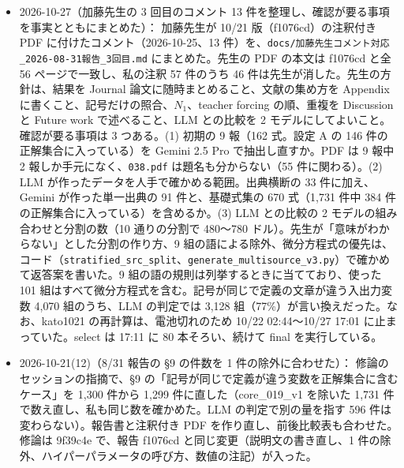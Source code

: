 \documentclass[11pt,a4paper]{jsarticle}
\begin{document}
\begin{itemize}[nosep]
    呼び出しの回数（異なるテストケースの数）は 10 分割で 1{,}673 回、3 分割で 1{,}307 回、1 回分の入力の最大は 952{,}918 トークン。費用の見積もり（出力 2{,}000 トークン/回）は 4 モデルの合計で 10 分割 1{,}261 USD、3 分割 990 USD。版 3 の記録には、使った \texttt{training\_cases.json} とテストケースの文の sha256 も残すようにした。有料の呼び出しはまだしていない（モデルは 2 つに減らしてよいと加藤先生から返事があった。分割の数とデータベースの作り直しが決まってから流す）。試験は 59 件。
  \item 2026-10-27（加藤先生の 3 回目のコメント 13 件を整理し、確認が要る事項を事実とともにまとめた）：
    加藤先生が 10/21 版（f1076cd）の注釈付き PDF に付けたコメント（2026-10-25、13 件）を、\texttt{docs/加藤先生コメント対応\_2026-08-31報告\_3回目.md} にまとめた。先生の PDF の本文は f1076cd と全 56 ページで一致し、私の注釈 57 件のうち 46 件は先生が消した。先生の方針は、結果を Journal 論文に随時まとめること、文献の集め方を Appendix に書くこと、記号だけの照合、$N_1$、teacher forcing の順、重複を Discussion と Future work で述べること、LLM との比較を 2 モデルにしてよいこと。確認が要る事項は 3 つある。(1) 初期の 9 報（162 式。設定 A の 146 件の正解集合に入っている）を Gemini 2.5 Pro で抽出し直すか。PDF は 9 報中 2 報しか手元になく、\texttt{038.pdf} は題名も分からない（55 件に関わる）。(2) LLM が作ったデータを人手で確かめる範囲。出典横断の 33 件に加え、Gemini が作った単一出典の 91 件と、基礎式集の 670 式（1{,}731 件中 384 件の正解集合に入っている）を含めるか。(3) LLM との比較の 2 モデルの組み合わせと分割の数（10 通りの分割で 480〜780 ドル）。先生が「意味がわからない」とした分割の作り方、9 組の語による除外、微分方程式の優先は、コード（\texttt{stratified\_src\_split}、\texttt{generate\_multisource\_v3.py}）で確かめて返答案を書いた。9 組の語の規則は列挙するときに当てており、使った 101 組はすべて微分方程式を含む。記号が同じで定義の文章が違う入出力変数 4{,}070 組のうち、LLM の判定では 3{,}128 組（77\%）が言い換えだった。なお、kato1021 の再計算は、電池切れのため 10/22 02:44〜10/27 17:01 に止まっていた。select は 17:11 に 80 本そろい、続けて final を実行している。
  \item 2026-10-21(12)（8/31 報告の \S 9 の件数を 1 件の除外に合わせた）：
    修論のセッションの指摘で、\S 9 の「記号が同じで定義が違う変数を正解集合に含むケース」を 1{,}300 件から 1{,}299 件に直した（core\_019\_v1 を除いた 1{,}731 件で数え直し、私も同じ数を確かめた。LLM の判定で別の量を指す 596 件は変わらない）。報告書と注釈付き PDF を作り直し、前後比較表も合わせた。修論は 9f39c4e で、報告 f1076cd と同じ変更（説明文の書き直し、1 件の除外、ハイパーパラメータの呼び方、数値の注記）が入った。

\end{itemize}
\end{document}
